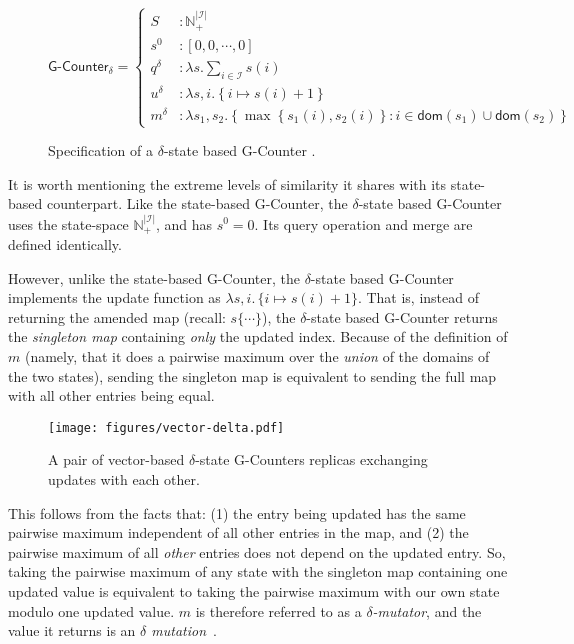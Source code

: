 \begin{figure}[H]
  \centering
  \[
    \textsf{G-Counter}_\delta = \left\{\begin{aligned}
      S &: \mathbb{N}_+^{|\mathcal{I}|} \\
      s^0 &: \left[ 0, 0, \cdots, 0 \right] \\
      q^\delta &: \lambda s. \sum_{i \in \mathcal{I}} s(i) \\
      u^\delta &: \lambda s,i. \left\{ i \mapsto s(i) + 1 \right\} \\
      m^\delta &: \lambda s_1, s_2. \left\{ \max\left\{ s_1(i), s_2(i) \right\}: i \in \mathsf{dom}(s_1) \cup
      \mathsf{dom}(s_2) \right\}
    \end{aligned}\right.
  \]
  \caption{Specification of a $\delta$-state based \textsf{G-Counter} \CRDT.}
\end{figure}

It is worth mentioning the extreme levels of similarity it shares with its
state-based counterpart. Like the state-based G-Counter, the $\delta$-state based
G-Counter uses the state-space $\mathbb{N}^{|\mathcal{I}|}_+$, and has $s^0 = 0$.
Its query operation and merge are defined identically.

However, unlike the state-based G-Counter, the $\delta$-state based G-Counter
implements the update function as $\lambda s,i.\, \{ i \mapsto s(i) + 1\}$. That
is, instead of returning the amended map (recall: $s\{ \cdots \}$), the
$\delta$-state based G-Counter returns the \emph{singleton map} containing
\emph{only} the updated index. Because of the definition of $m$ (namely, that it
does a pairwise maximum over the \emph{union} of the domains of the two states),
sending the singleton map is equivalent to sending the full map with all other
entries being equal.

\begin{figure}[H]
  \centering
  \texttt{[image: figures/vector-delta.pdf]}
  \caption{A pair of vector-based $\delta$-state G-Counters replicas exchanging
    updates with each other.}
\end{figure}

This follows from the facts that: (1) the entry being updated has the same
pairwise maximum independent of all other entries in the map, and (2) the
pairwise maximum of all \emph{other} entries does not depend on the updated
entry. So, taking the pairwise maximum of any state with the singleton map
containing one updated value is equivalent to taking the pairwise maximum with
our own state modulo one updated value. $m$ is therefore referred to as a
\emph{$\delta$-mutator}, and the value it returns is an \emph{$\delta$
mutation}~\citep{almedia18}.

